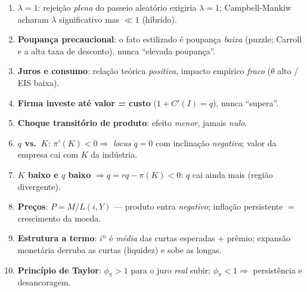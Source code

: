 \documentclass[12pt, a4paper]{article}
\begin{document}
\begin{resultbox}[title={As 10 armadilhas que o professor mais usa (todas já caíram)}]
\begin{enumerate}[leftmargin=1.6em, itemsep=0.2em]
\item \textbf{$\lambda = 1$}: rejeição \emph{plena} do passeio aleatório
exigiria $\lambda=1$; Campbell-Mankiw acharam $\lambda$ significativo mas
$\ll 1$ (híbrido).
\item \textbf{Poupança precaucional}: o fato estilizado é poupança
\emph{baixa} (puzzle; Carroll e a alta taxa de desconto), nunca ``elevada
poupança''.
\item \textbf{Juros e consumo}: relação teórica \emph{positiva}, impacto
empírico \emph{fraco} ($\theta$ alto / EIS baixa).
\item \textbf{Firma investe até valor = custo} ($1 + C'(I) = q$), nunca
``supera''.
\item \textbf{Choque transitório de produto}: efeito \emph{menor}, jamais
\emph{nulo}.
\item \textbf{$q$ vs.\ $K$}: $\pi'(K)<0 \Rightarrow$ \emph{locus} $\dot q = 0$
com inclinação \emph{negativa}; valor da empresa cai com $K$ da indústria.
\item \textbf{$K$ baixo e $q$ baixo} $\Rightarrow \dot q = rq - \pi(K) < 0$:
$q$ cai ainda mais (região divergente).
\item \textbf{Preços}: $P = M/L(i,Y)$ --- produto entra \emph{negativo};
inflação persistente $=$ crescimento da moeda.
\item \textbf{Estrutura a termo}: $i^n$ é \emph{média} das curtas esperadas
$+$ prêmio; expansão monetária derruba as curtas (liquidez) e sobe as longas.
\item \textbf{Princípio de Taylor}: $\phi_\pi > 1$ para o juro \emph{real}
subir; $\phi_\pi<1 \Rightarrow$ persistência e desancoragem.
\end{enumerate}
\end{resultbox}
\end{document}
